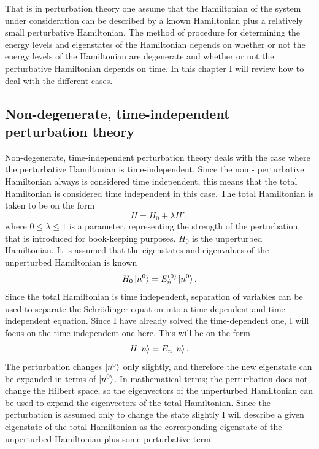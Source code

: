 That is in perturbation theory one assume that the Hamiltonian of the system under consideration can be described by a known Hamiltonian plus a relatively small perturbative Hamiltonian. The method of procedure for determining the energy levels and eigenstates of the Hamiltonian depends on whether or not the energy levels of the Hamiltonian are degenerate and whether or not the perturbative Hamiltonian depends on time. In this chapter I will review how to deal with the different cases.

\subsection*{Non-degenerate, time-independent perturbation theory}
Non-degenerate, time-independent perturbation theory deals with the case where the perturbative Hamiltonian is time-independent. Since the non - perturbative Hamiltonian always is considered time independent, this means that the total Hamiltonian is considered time independent in this case. The total Hamiltonian is taken to be on the form
\begin{equation}
	H=H_0+\lambda H',
	\label{ham13}
\end{equation} 
where $0\leq\lambda\leq1$ is a parameter, representing the strength of the perturbation, that is introduced for book-keeping purposes.  $H_0$ is the unperturbed Hamiltonian. It is assumed that the eigenstates and eigenvalues of the unperturbed Hamiltonian is known
\begin{equation}
	H_0\ket{n^0}=E_n^{(0)}\ket{n^0}.
\end{equation} 
Since the total Hamiltonian is time independent, separation of variables can be used to separate the Schrödinger equation into a time-dependent and time-independent equation. Since I have already solved the time-dependent one, I will focus on the time-independent one here. This will be on the form
\begin{equation}
	H\ket{n}=E_n\ket{n}.
	\label{ham12}
\end{equation} 
The perturbation changes $\ket{n^0}$ only slightly, and therefore the new eigenstate can be expanded in terms of $\ket{n^0}$. In mathematical terms; the perturbation does not change the Hilbert space, so the eigenvectors of the unperturbed Hamiltonian can be used to expand the eigenvectors of the total Hamiltonian. Since the perturbation is assumed only to change the state slightly I will describe a given eigenstate of the total Hamiltonian as the corresponding eigenstate of the unperturbed Hamiltonian plus some perturbative term
